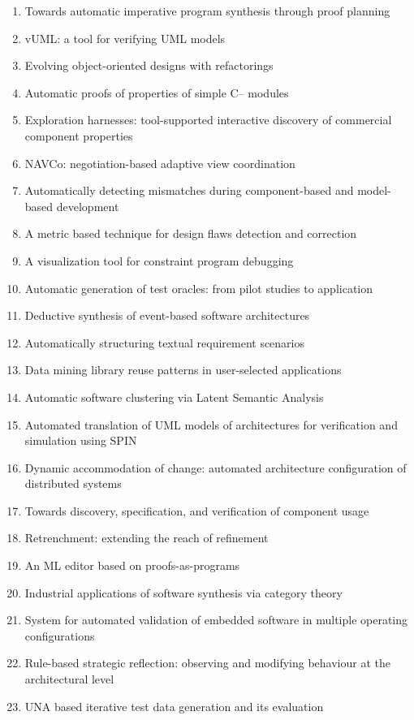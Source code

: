 \begin{enumerate}[itemsep=-1ex]
  \item Towards automatic imperative program synthesis through proof planning
  \item vUML: a tool for verifying UML models
  \item Evolving object-oriented designs with refactorings
  \item Automatic proofs of properties of simple C-- modules
  \item Exploration harnesses: tool-supported interactive discovery of commercial component properties
  \item NAVCo: negotiation-based adaptive view coordination
  \item Automatically detecting mismatches during component-based and model-based development
  \item A metric based technique for design flaws detection and correction
  \item A visualization tool for constraint program debugging
  \item Automatic generation of test oracles: from pilot studies to application
  \item Deductive synthesis of event-based software architectures
  \item Automatically structuring textual requirement scenarios
  \item Data mining library reuse patterns in user-selected applications
  \item Automatic software clustering via Latent Semantic Analysis
  \item Automated translation of UML models of architectures for verification and simulation using SPIN
  \item Dynamic accommodation of change: automated architecture configuration of distributed systems
  \item Towards discovery, specification, and verification of component usage
  \item Retrenchment: extending the reach of refinement
  \item An ML editor based on proofs-as-programs
  \item Industrial applications of software synthesis via category theory
  \item System for automated validation of embedded software in multiple operating configurations
  \item Rule-based strategic reflection: observing and modifying behaviour at the architectural level
  \item UNA based iterative test data generation and its evaluation

\end{enumerate}
